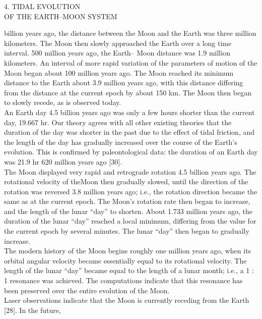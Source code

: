 \documentclass[fontsize = 11pt,a4paper]{article}
\begin{document}
\pagebreak



\begin{multicols}{2}
\begin{center}
 4. TIDAL EVOLUTION\\
OF THE EARTH–MOON SYSTEM
\end{center}
 billion years ago, the distance between the
Moon and the Earth was three million kilometers.
The Moon then slowly approached the Earth over a
long time interval. 500 million years ago, the Earth–
Moon distance was 1.9 million kilometers. An interval
of more rapid variation of the parameters of
motion of the Moon began about 100 million years
ago. The Moon reached its minimum distance to the
Earth about 3.9 million years ago, with this distance
differing from the distance at the current epoch by
about 150 km. The Moon then began to slowly
recede, as is observed today.\\
\indent An Earth day 4.5 billion years ago was only a few
hours shorter than the current day, 19.667 hr. Our
theory agrees with all other existing theories that the
duration of the day was shorter in the past due to
the effect of tidal friction, and the length of the day
has gradually increased over the course of the Earth’s
evolution. This is confirmed by paleontological data:
the duration of an Earth day was 21.9 hr 620 million
years ago [30].\\
\indent The Moon displayed very rapid and retrograde rotation
4.5 billion years ago. The rotational velocity of
theMoon then gradually slowed, until the direction of
the rotation was reversed 3.8 million years ago; i.e.,
the rotation direction became the same as at the current
epoch. The Moon’s rotation rate then began to
increase, and the length of the lunar “day” to shorten.
About 1.733 million years ago, the duration of the
lunar “day” reached a local minimum, differing from
the value for the current epoch by several minutes.
The lunar “day” then began to gradually increase.\\
\indent The modern history of the Moon begins roughly
one million years ago, when its orbital angular velocity
became essentially equal to its rotational velocity.
The length of the lunar “day” became equal to the
length of a lunar month; i.e., a 1 : 1 resonance was
achieved. The computations indicate that this resonance
has been preserved over the entire evolution of
the Moon. \\
\indent Laser observations indicate that the Moon is currently
receding from the Earth [28]. In the future,

\end{multicols}
\end{document}
